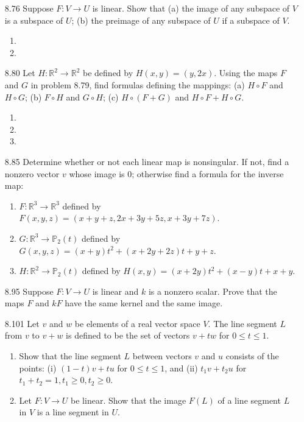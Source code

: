 \documentclass[12pt]{article}
\theoremstyle{definition}
\theoremstyle{plain}
\begin{document}
\begin{enumerate}
\item[8.76] Suppose $F:V\rightarrow U$ is linear. Show that (a) the image of any subspace of $V$ is a subspace of $U$; (b) the preimage of any subspace of $U$ if a subspace of $V$.
	\begin{enumerate}
	\item
	\item
	\end{enumerate}

\item[8.80] Let $H:\mathbb{R}^2\rightarrow\mathbb{R}^2$ be defined by $H(x,y)=(y,2x)$. Using the maps $F$ and $G$ in problem 8.79, find formulas defining the mappings: (a) $H\circ F$ and $H\circ G$; (b) $F\circ H$ and $G\circ H$; (c) $H\circ(F+G)$ and $H\circ F + H\circ G$.
	\begin{enumerate}
	\item
	\item
	\item
	\end{enumerate}
	
\item[8.85] Determine whether or not each linear map is nonsingular. If not, find a nonzero vector $v$ whose image is 0; otherwise find a formula for the inverse map:
	\begin{enumerate}
	\item $F:\mathbb{R}^3\rightarrow\mathbb{R}^3$ defined by $F(x,y,z)=(x+y+z,2x+3y+5z,x+3y+7z)$.
	\item $G:\mathbb{R}^3\rightarrow\mathbb{P}_2(t)$ defined by $G(x,y,z)=(x+y)t^2+(x+2y+2z)t+y+z$.
	\item $H:\mathbb{R}^2\rightarrow\mathbb{P}_2(t)$ defined by $H(x,y)=(x+2y)t^2+(x-y)t+x+y$.
	\end{enumerate}

\item[8.95] Suppose $F:V\rightarrow U$ is linear and $k$ is a nonzero scalar. Prove that the maps $F$ and $kF$ have the same kernel and the same image.

\item[8.101] Let $v$ and $w$ be elements of a real vector space $V$. The line segment $L$ from $v$ to $v+w$ is defined to be the set of vectors $v+tw$ for $0\leq t \leq 1$.
	\begin{enumerate}
	\item Show that the line segment $L$ between vectors $v$ and $u$ consists of the points: (i) $(1-t)v+tu$ for $0 \leq t \leq 1$, and (ii) $t_1v+t_2u$ for $t_1+t_2=1, t_1\geq 0, t_2\geq 0$.
	\item Let $F:V\rightarrow U$ be linear. Show that the image $F(L)$ of a line segment $L$ in $V$ is a line segment in $U$.
	\end{enumerate}


\end{enumerate}
\end{document}
